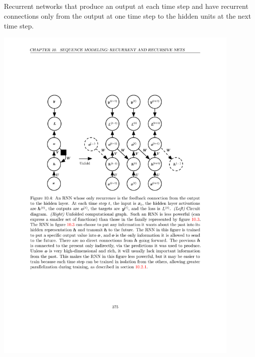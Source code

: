 \documentclass[12pt, a4paper]{article}
\begin{document}
\subsection{}
Recurrent networks that produce an output at each time step and have recurrent connections only from the output at one time step to the hidden units at the next time step.
\begin{center}
    \includegraphics[width=0.9\textwidth]{../imgs/RNN_2.pdf}
\end{center}
\end{document}
